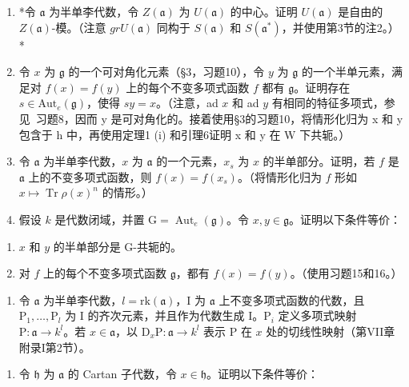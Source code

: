\begin{enumerate}
\def\labelenumi{\arabic{enumi})}
\setcounter{enumi}{13}
\item
  *令 \(\mathfrak{a}\) 为半单李代数，令 \(Z(\mathfrak{a})\) 为 \(U(\mathfrak{a})\) 的中心。证明 \(U(\mathfrak{a})\) 是自由的 \(Z(\mathfrak{a})\)-模。（注意 \(grU(\mathfrak{a})\) 同构于 \(S(\mathfrak{a})\) 和 \(S(\mathfrak{a}^*)\)，并使用第3节的注2。）*
\item
  令 \(x\) 为 \(\mathfrak{g}\) 的一个可对角化元素（§3，习题10），令 \(y\) 为 \(\mathfrak{g}\) 的一个半单元素，满足对 \(f(x) = f(y)\) 上的每个不变多项式函数 \(f\) 都有 \(\mathfrak{g}\)。证明存在 \(s \in \mathrm{Aut}_e(\mathfrak{g})\)，使得 \(sy = x\)。（注意，ad \(x\) 和 ad \(y\) 有相同的特征多项式，参见~习题8，因而 y 是可对角化的。接着使用§3的习题10，将情形化归为 x 和 y 包含于 h 中，再使用定理1 (i) 和引理6证明 x 和 y 在 W 下共轭。）
\item
  令 \(\mathfrak{a}\) 为半单李代数，\(x\) 为 \(\mathfrak{a}\) 的一个元素，\(x_{s}\) 为 \(x\) 的半单部分。证明，若 \(f\) 是 \(\mathfrak{a}\) 上的不变多项式函数，则 \(f(x) = f(x_{s})\)。（将情形化归为 \(f\) 形如 \(x \mapsto \operatorname{Tr} \rho(x)^n\) 的情形。）
\item
  假设 \(k\) 是代数闭域，并置 \(\mathrm{G} = \operatorname{Aut}_e(\mathfrak{g})\)。令 \(x, y \in \mathfrak{g}\)。证明以下条件等价：
\end{enumerate}

\begin{enumerate}
\def\labelenumi{(\roman{enumi})}
\item
  \(x\) 和 \(y\) 的半单部分是 G-共轭的。
\item
  对 \(f\) 上的每个不变多项式函数 \(\mathfrak{g}\)，都有 \(f(x) = f(y)\)。（使用习题15和16。）
\end{enumerate}

\begin{enumerate}
\def\labelenumi{\arabic{enumi})}
\setcounter{enumi}{17}
\tightlist
\item
  令 \(\mathfrak{a}\) 为半单李代数，\(l = \mathrm{rk}(\mathfrak{a})\)，I 为 \(\mathfrak{a}\) 上不变多项式函数的代数，且 \(\mathrm{P}_1, \ldots, \mathrm{P}_l\) 为 I 的齐次元素，并且作为代数生成 I。\(\mathrm{P}_i\) 定义多项式映射 \(\mathrm{P} : \mathfrak{a} \to k^l\)。若 \(x \in \mathfrak{a}\)，以 \(\mathrm{D}_x\mathrm{P} : \mathfrak{a} \to k^l\) 表示 P 在 \(x\) 处的切线性映射（第VII章附录I第2节）。
\end{enumerate}

\begin{enumerate}
\def\labelenumi{\alph{enumi})}
\tightlist
\item
  令 \(\mathfrak{h}\) 为 \(\mathfrak{a}\) 的 Cartan 子代数，令 \(x \in \mathfrak{h}\)。证明以下条件等价：
\end{enumerate}

